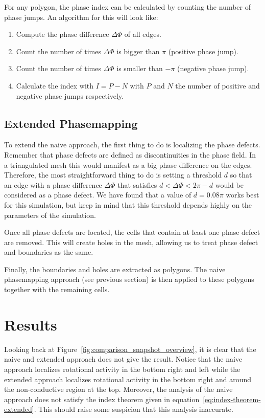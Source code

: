 \documentclass[twocolumn]{article}
\begin{document}
For any polygon, the phase index can be calculated by counting the
number of phase jumps. An algorithm for this will look like:

\begin{enumerate}
    \def\labelenumi{\arabic{enumi}.}
    \tightlist
  \item
    Compute the phase difference \(\Delta\Phi\) of all edges.
  \item
    Count the number of times \(\Delta\Phi\) is bigger than \(\pi\)
    (positive phase jump).
  \item
    Count the number of times \(\Delta\Phi\) is smaller than \(-\pi\)
    (negative phase jump).
  \item
    Calculate the index with \(I = P - N\) with \(P\) and \(N\) the number
    of positive and negative phase jumps respectively.
\end{enumerate}

\subsection{Extended Phasemapping}\label{extended-phasemapping}

To extend the naive approach, the first thing to do is localizing the
phase defects. Remember that phase defects are defined as
discontinuities in the phase field. In a triangulated mesh this would
manifest as a big phase difference on the edges. Therefore, the most
straightforward thing to do is setting a threshold \(d\) so that an edge
with a phase difference \(\Delta\Phi\) that satisfies
\(d<\Delta\Phi<2\pi-d\) would be considered as a phase defect. We have
found that a value of \(d=0.08\pi\) works best for this simulation, but
keep in mind that this threshold depends highly on the parameters of the
simulation.

Once all phase defects are located, the cells that contain at least one
phase defect are removed. This will create holes in the mesh, allowing
us to treat phase defect and boundaries as the same.

Finally, the boundaries and holes are extracted as polygons. The naive
phasemapping approach (see previous section) is then applied to these
polygons together with the remaining cells.

\section{Results}\label{results}

Looking back at Figure~\ref{fig:comparison_snapshot_overview}, it is
clear that the naive
and extended approach does not give the result. Notice that the naive
approach localizes rotational activity in the bottom right and left
while the extended approach localizes rotational activity in the bottom
right and around the non-conductive region at the top. Moreover, the
analysis of the naive approach does not satisfy the index theorem given
in equation~\ref{eq:index-theorem-extended}. This should raise some
suspicion that this analysis
inaccurate.
\end{document}
